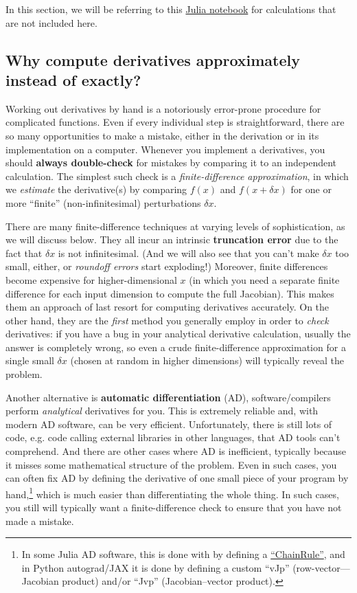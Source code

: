 In this section, we will be referring to this \href{https://github.com/mitmath/matrixcalc/blob/main/notes/Finite%20difference%20checks.ipynb}{Julia notebook} for calculations that are not included here.

\subsection{Why compute derivatives approximately instead of exactly?} \label{sec:approximation}

Working out derivatives by hand is a notoriously error-prone procedure for complicated functions.  Even if every individual step is straightforward, there are so many opportunities to make a mistake, either in the derivation or in its implementation on a computer.   Whenever you implement a derivatives, you should \textbf{always double-check} for mistakes by comparing it to an independent calculation.  The simplest such check is a \emph{finite-difference approximation}, in which we \emph{estimate} the derivative(s) by comparing $f(x)$ and $f(x + \delta x)$ for one or more ``finite'' (non-infinitesimal) perturbations $\delta x$.

There are many finite-difference techniques at varying levels of sophistication, as we will discuss below.  They all incur an intrinsic \textbf{truncation error} due to the fact that $\delta x$ is not infinitesimal.  (And we will also see that you can't make $\delta x$ too small, either, or \emph{roundoff errors} start exploding!)   Moreover, finite differences become expensive for higher-dimensional $x$ (in which you need a separate finite difference for each input dimension to compute the full Jacobian).   This makes them an approach of last resort for computing derivatives accurately.  On the other hand, they are the \emph{first} method you generally employ in order to \emph{check} derivatives: if you have a bug in your analytical derivative calculation, usually the answer is completely wrong, so even a crude finite-difference approximation for a single small $\delta x$ (chosen at random in higher dimensions) will typically reveal the problem.

Another alternative is \textbf{automatic differentiation} (AD), software/compilers perform \emph{analytical} derivatives for you. This is extremely reliable and, with modern AD software, can be very efficient. Unfortunately, there is still lots of code, e.g. code calling external libraries in other languages, that AD tools can't comprehend. And there are other cases where AD is inefficient, typically because it misses some mathematical structure of the problem.  Even in such cases, you can often fix AD by defining the derivative of one small piece of your program by hand,\footnote{In some Julia AD software, this is done with by defining a  \href{https://github.com/JuliaDiff/ChainRulesCore.jl}{``ChainRule''}, and in Python autograd/JAX it is done by defining a custom ``vJp'' (row-vector—Jacobian product) and/or ``Jvp'' (Jacobian–vector product).} which is much easier than differentiating the whole thing.  In such cases, you still will typically want a finite-difference check to ensure that you have not made a mistake.

